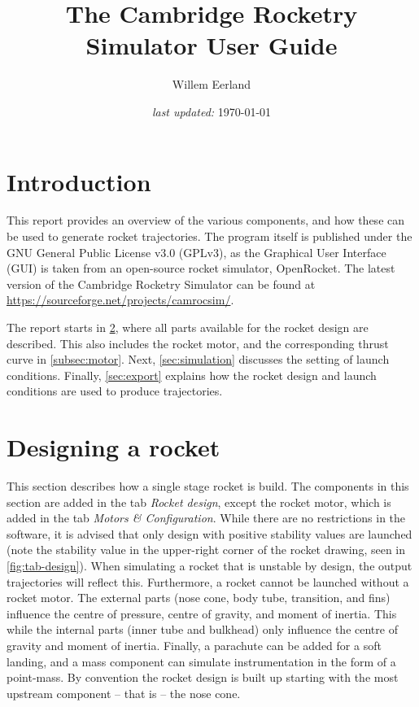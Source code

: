 \documentclass[11pt, a4paper]{article}
\title{The Cambridge Rocketry Simulator User Guide}
\author{Willem Eerland}
\date{\emph{last updated:} \today}
\begin{document}
\maketitle

\newpage

\tableofcontents

\newpage

\section{Introduction}

This report provides an overview of the various components, and how these can be used to generate rocket trajectories. The program itself is published under the GNU General Public License v3.0 (GPLv3), as the Graphical User Interface (GUI) is taken from an open-source rocket simulator, OpenRocket. The latest version of the Cambridge Rocketry Simulator can be found at \url{https://sourceforge.net/projects/camrocsim/}.

The report starts in \cref{sec:design}, where all parts available for the rocket design are described. This also includes the rocket motor, and the corresponding thrust curve in \cref{subsec:motor}. Next, \cref{sec:simulation} discusses the setting of launch conditions. Finally, \cref{sec:export} explains how the rocket design and launch conditions are used to produce trajectories.

\section{Designing a rocket} \label{sec:design}

This section describes how a single stage rocket is build. The components in this section are added in the tab \emph{Rocket design}, except the rocket motor, which is added in the tab \emph{Motors \& Configuration}.
%
While there are no restrictions in the software, it is advised that only design with positive stability values are launched (note the stability value in the upper-right corner of the rocket drawing, seen in \cref{fig:tab-design}). When simulating a rocket that is unstable by design, the output trajectories will reflect this.
%
Furthermore, a rocket cannot be launched without a rocket motor. The external parts (nose cone, body tube, transition, and fins) influence the centre of pressure, centre of gravity, and moment of inertia. This while the internal parts (inner tube and bulkhead) only influence the centre of gravity and moment of inertia. Finally, a parachute can be added for a soft landing, and a mass component can simulate instrumentation in the form of a point-mass.
%
By convention the rocket design is built up starting with the most upstream component -- that is -- the nose cone.
\end{document}
